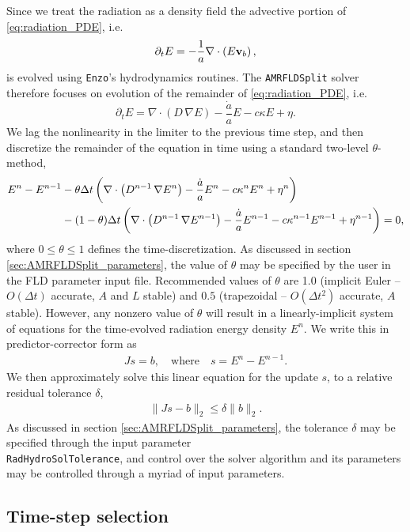 \documentclass[letterpaper,10pt]{article}
\renewcommand{\(}{\left(}
\renewcommand{\)}{\right)}
\newcommand{\vb}{{\bf v}_b}
\newcommand{\dt}{\Delta t}
\begin{document}
Since we treat the radiation as a density field the advective portion
of \eqref{eq:radiation_PDE}, i.e. 
\[
  \partial_{t} E = -\frac1a \nabla\cdot\(E\vb\),
\]
is evolved using {\tt Enzo}'s hydrodynamics routines.  The 
{\tt AMRFLDSplit} solver therefore focuses on evolution of the
remainder of \eqref{eq:radiation_PDE}, i.e.
\[
  \partial_{t} E = \nabla\cdot\(D\,\nabla E\) - \frac{\dot{a}}{a} E - c\kappa E + \eta.
\]
We lag the nonlinearity in the limiter to the previous time step, and
then discretize the remainder of the equation in time using a standard
two-level $\theta$-method,
\begin{align}
  \label{eq:radiation_PDE_theta}
  E^n - E^{n-1} &- \theta\dt\left(\nabla\cdot\(D^{n-1}\,\nabla E^n\) - \frac{\dot{a}}{a} E^n -
    c\kappa^n E^n + \eta^n\right) \\ 
  \notag
  & - (1-\theta)\dt\left(\nabla\cdot\(D^{n-1}\,\nabla E^{n-1}\) - \frac{\dot{a}}{a} E^{n-1} -
    c\kappa^{n-1} E^{n-1} + \eta^{n-1}\right) = 0,
\end{align}
where $0\le\theta\le 1$ defines the time-discretization.  As discussed
in section \ref{sec:AMRFLDSplit_parameters}, the value of $\theta$ may
be specified by the user in the FLD parameter input file. Recommended
values of $\theta$ are 1.0 (implicit Euler -- $O(\dt)$ accurate,
$A$ and $L$ stable) and $0.5$ (trapezoidal -- $O(\dt^2)$
accurate, $A$ stable).  However, any nonzero value of $\theta$ will
result in a linearly-implicit system of equations for the
time-evolved radiation energy density $E^n$.  We write this in
predictor-corrector form as
\begin{align}
\label{eq:linear_system}
  J s = b, \quad\text{where}\quad s = E^n - E^{n-1}.
\end{align}
We then approximately solve this linear equation for the update $s$,
to a relative residual tolerance $\delta$,
\begin{align}
\label{eq:linear_system_approx}
  \| J s - b \|_2 \le \delta \|b\|_2.
\end{align}
As discussed in section \ref{sec:AMRFLDSplit_parameters}, the
tolerance $\delta$ may be specified through the input parameter \\
{\tt RadHydroSolTolerance}, and control over the solver algorithm and
its parameters may be controlled through a myriad of input parameters.




\subsection{Time-step selection}
\label{sec:AMRFLDSplit_dt_selection}
\end{document}
